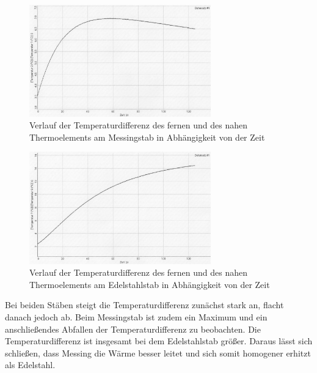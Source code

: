 \begin{figure}
  \centering
  \includegraphics[width=0.7\textwidth]{data/t2minust1.JPEG}
  \caption{Verlauf der Temperaturdifferenz des fernen und des nahen Thermoelements am Messingstab
   in Abhängigkeit von der Zeit}
  \label{fig:Messing_diff}
\end{figure}

\begin{figure}
  \centering
  \includegraphics[width=0.7\textwidth]{data/t7minust8.JPEG}
  \caption{Verlauf der Temperaturdifferenz des fernen und des nahen Thermoelements am Edelstahlstab
   in Abhängigkeit von der Zeit}
  \label{fig:Stahl_diff}
\end{figure}

Bei beiden Stäben steigt die Temperaturdifferenz zunächst stark an, flacht danach jedoch ab.
Beim Messingstab ist zudem ein Maximum und ein anschließendes Abfallen der Temperaturdifferenz
zu beobachten. Die Temperaturdifferenz ist insgesamt bei dem Edelstahlstab größer.
Daraus lässt sich schließen, dass Messing die Wärme besser leitet und sich somit
homogener erhitzt als Edelstahl.


